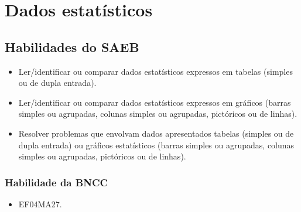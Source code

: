 \chapter{Dados estatísticos}

\section*{Habilidades do SAEB}

\begin{itemize}
\item Ler/identificar ou comparar dados estatísticos expressos em tabelas
(simples ou de dupla entrada).

\item Ler/identificar ou comparar dados estatísticos expressos em gráficos
(barras simples ou agrupadas, colunas simples ou agrupadas, pictóricos
ou de linhas).

\item Resolver problemas que envolvam dados apresentados tabelas (simples ou
de dupla entrada) ou gráficos estatísticos (barras simples ou agrupadas,
colunas simples ou agrupadas, pictóricos ou de linhas).
\end{itemize}

\subsection{Habilidade da BNCC}

\begin{itemize}
\item EF04MA27.
\end{itemize}

